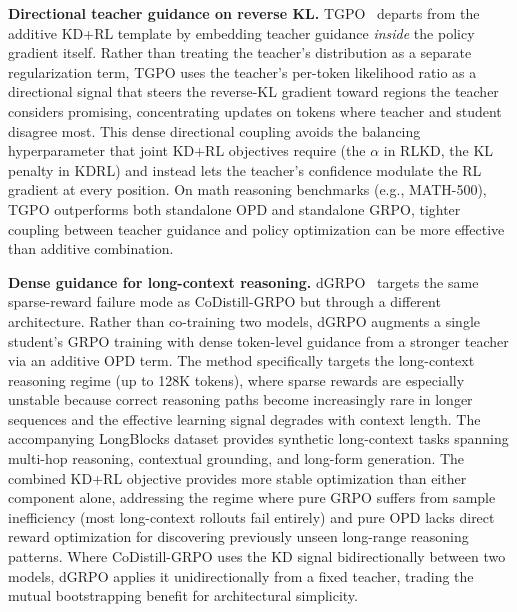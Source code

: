 \documentclass{article} %
\begin{document}
\textbf{Directional teacher guidance on reverse KL.} TGPO~\citep{2605.13230} departs from the additive KD+RL template by embedding teacher guidance \emph{inside} the policy gradient itself. Rather than treating the teacher's distribution as a separate regularization term, TGPO uses the teacher's per-token likelihood ratio as a directional signal that steers the reverse-KL gradient toward regions the teacher considers promising, concentrating updates on tokens where teacher and student disagree most. This dense directional coupling avoids the balancing hyperparameter that joint KD+RL objectives require (the $\alpha$ in RLKD, the KL penalty in KDRL) and instead lets the teacher's confidence modulate the RL gradient at every position. On math reasoning benchmarks (e.g., MATH-500), TGPO outperforms both standalone OPD and standalone GRPO, tighter coupling between teacher guidance and policy optimization can be more effective than additive combination.

\textbf{Dense guidance for long-context reasoning.} dGRPO~\citep{2605.12227} targets the same sparse-reward failure mode as CoDistill-GRPO but through a different architecture. Rather than co-training two models, dGRPO augments a single student's GRPO training with dense token-level guidance from a stronger teacher via an additive OPD term. The method specifically targets the long-context reasoning regime (up to 128K tokens), where sparse rewards are especially unstable because correct reasoning paths become increasingly rare in longer sequences and the effective learning signal degrades with context length. The accompanying LongBlocks dataset provides synthetic long-context tasks spanning multi-hop reasoning, contextual grounding, and long-form generation. The combined KD+RL objective provides more stable optimization than either component alone, addressing the regime where pure GRPO suffers from sample inefficiency (most long-context rollouts fail entirely) and pure OPD lacks direct reward optimization for discovering previously unseen long-range reasoning patterns. Where CoDistill-GRPO uses the KD signal bidirectionally between two models, dGRPO applies it unidirectionally from a fixed teacher, trading the mutual bootstrapping benefit for architectural simplicity.
\end{document}
